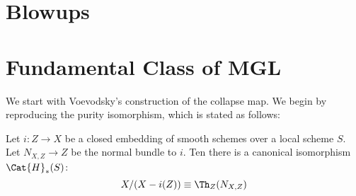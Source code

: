 \section{Blowups}

\section{Fundamental Class of MGL}

We start with Voevodsky's construction of the collapse
map. We begin by reproducing the purity isomorphism, which
is stated as follows:

\begin{thm}
Let $i: Z \to X$ be a closed embedding of smooth schemes over a 
local scheme $S$. Let $N_{X,Z} \to Z$ be the normal bundle to 
$i$. Ten there is a canonical isomorphism $\Cat{H}_*(S)$:
\[
X/(X - i(Z)) \equiv \Th_Z(N_{X,Z})
\]
\end{thm}
